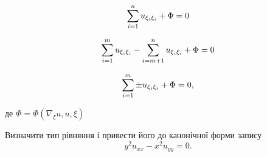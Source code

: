 \begin{th_equation}
	\begin{equation}
		\displaystyle\sum\limits_{i=1}^n u_{\xi_i\xi_i} + \Phi = 0
	\end{equation}
\end{th_equation}

\begin{th_equation}
	\begin{equation}
		\displaystyle\sum\limits_{i=1}^m u_{\xi_i\xi_i} - \displaystyle\sum\limits_{i=m+1}^n u_{\xi_i\xi_i} + \Phi = 0
	\end{equation}
\end{th_equation}

\begin{th_equation}
	\begin{equation}
		\displaystyle\sum\limits_{i=1}^m \pm u_{\xi_i\xi_i} + \Phi = 0,
	\end{equation}
\end{th_equation}
де $\Phi=\Phi(\nabla_\xi u, u,\xi) $

\begin{example}
	Визначити тип рівняння і привести його до канонічної форми запису
	\begin{equation*}
		y^2 u_{xx} - x^2 u_{yy} = 0.
	\end{equation*}
\end{example}

